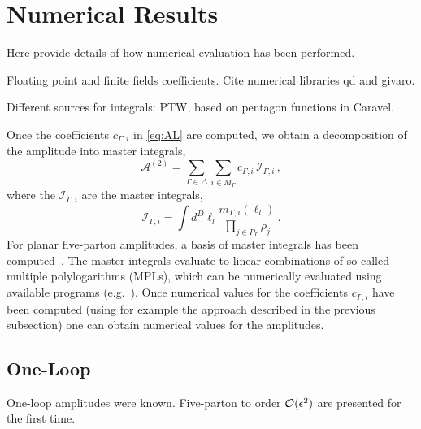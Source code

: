 \section{Numerical Results}

Here provide details of how numerical evaluation has been performed.

Floating point and finite fields coefficients.
Cite numerical libraries qd and givaro.

Different sources for integrals: PTW, based on pentagon functions in Caravel.



Once the coefficients $c_{\Gamma,i}$ in \cref{eq:AL} are computed,
we obtain a decomposition of the amplitude into master integrals,
\begin{equation}
  \mathcal{A}^{(2)}=\sum_{\Gamma\in\Delta}
  \sum_{i\in M_\Gamma} c_{\Gamma,i}\,
  \mathcal{I}_{\Gamma,i}\,,
  \label{eq:Amaster}
\end{equation}
where the $\mathcal{I}_{\Gamma,i}$ are the master integrals,
\begin{equation}
  \mathcal{I}_{\Gamma,i}=\int d^D\ell_l
  \frac{m_{\Gamma,i}(\ell_l)}
  {\prod_{j\in P_\Gamma}\rho_j}\,.
\end{equation}
For planar five-parton amplitudes, a basis of master integrals has been 
computed~\cite{Papadopoulos:2015jft,Gehrmann:2018yef}.
The master integrals evaluate to linear combinations of so-called 
multiple polylogarithms (MPLs), which can be 
numerically evaluated using available programs 
(e.g.~\cite{Vollinga:2004sn}). Once numerical values for the coefficients 
$c_{\Gamma,i}$ have been  computed (using for example 
the approach described in the previous subsection) one can obtain numerical values
for the amplitudes.


\subsection{One-Loop}

One-loop amplitudes were known. Five-parton to order $\mathcal{O}(\epsilon^2)$ are presented for the first time.

